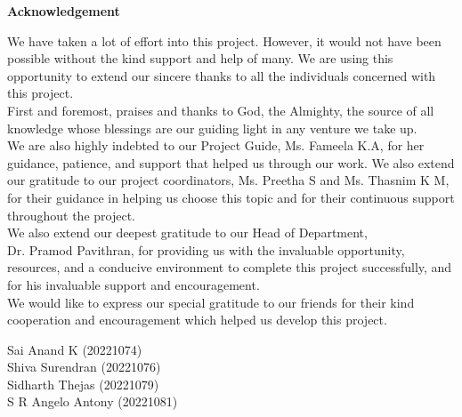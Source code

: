 \documentclass{report}
\begin{document}
\begin{center}
\end{center}

\vspace*{\fill}

\newpage
{}
\begin{center}
\textbf{\LARGE Acknowledgement}
\end{center}
\vspace{3em}

\hspace{2em}\Large We have taken a lot of effort into this project. However, it would not have been possible without the kind support and help of many. We are using this opportunity to extend our sincere thanks to all the individuals concerned with this project.\\

First and foremost, praises and thanks to God, the Almighty, the source of all knowledge whose blessings are our guiding light in any venture we take up.\\

We are also highly indebted to our Project Guide, Ms. Fameela K.A, for her guidance, patience, and support that helped us through our work. We also extend our gratitude to our project coordinators, Ms. Preetha S and Ms. Thasnim K M, for their guidance in helping us choose this topic and for their continuous support throughout the project.\\

We also extend our deepest gratitude to our Head of Department, \\Dr. Pramod Pavithran, for providing us with the invaluable opportunity, resources, and a conducive environment to complete this project successfully, and for his invaluable support and encouragement.\\

We would like to express our special gratitude to our friends for their kind cooperation and encouragement which helped us develop this project.


 \begin{flushleft}

  \vspace{2em}
 \Large 
Sai Anand K (20221074)\\
Shiva Surendran (20221076)\\
Sidharth Thejas (20221079)\\
S R Angelo Antony (20221081)\\

 \end{flushleft}
\end{document}
